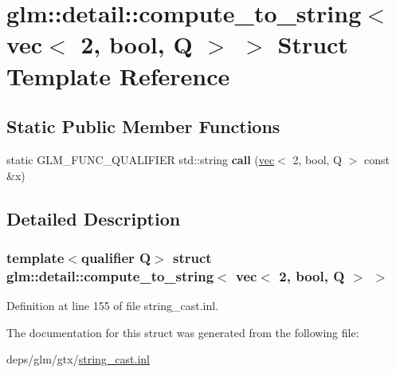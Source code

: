 \hypertarget{structglm_1_1detail_1_1compute__to__string_3_01vec_3_012_00_01bool_00_01Q_01_4_01_4}{}\section{glm\+:\+:detail\+:\+:compute\+\_\+to\+\_\+string$<$ vec$<$ 2, bool, Q $>$ $>$ Struct Template Reference}
\label{structglm_1_1detail_1_1compute__to__string_3_01vec_3_012_00_01bool_00_01Q_01_4_01_4}
\subsection*{Static Public Member Functions}
\begin{DoxyCompactItemize}
\item 
\mbox{\label{structglm_1_1detail_1_1compute__to__string_3_01vec_3_012_00_01bool_00_01Q_01_4_01_4_a08b55aa0b86bc8176b9fa02f0520c434}} 
static G\+L\+M\+\_\+\+F\+U\+N\+C\+\_\+\+Q\+U\+A\+L\+I\+F\+I\+ER std\+::string {\bfseries call} (\hyperlink{structglm_1_1vec}{vec}$<$ 2, bool, Q $>$ const \&x)
\end{DoxyCompactItemize}


\subsection{Detailed Description}
\subsubsection*{template$<$qualifier Q$>$\newline
struct glm\+::detail\+::compute\+\_\+to\+\_\+string$<$ vec$<$ 2, bool, Q $>$ $>$}



Definition at line 155 of file string\+\_\+cast.\+inl.



The documentation for this struct was generated from the following file\+:\begin{DoxyCompactItemize}
\item 
deps/glm/gtx/\hyperlink{string__cast_8inl}{string\+\_\+cast.\+inl}\end{DoxyCompactItemize}
